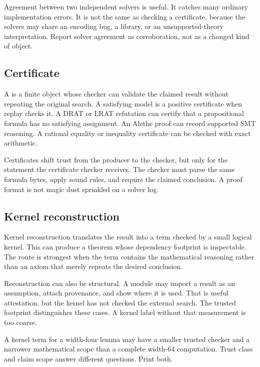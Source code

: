 Agreement between two independent solvers is useful. It catches many ordinary
implementation errors. It is not the same as checking a certificate, because
the solvers may share an encoding bug, a library, or an unsupported-theory
interpretation. Report solver agreement as corroboration, not as a changed
kind of object.

\subsection{Certificate}

A  is a finite object whose checker can validate the
claimed result without repeating the original search. A satisfying model is a
positive certificate when replay checks it. A DRAT or LRAT refutation can
certify that a propositional formula has no satisfying assignment. An Alethe
proof can record supported SMT reasoning. A rational equality or inequality
certificate can be checked with exact arithmetic.

Certificates shift trust from the producer to the checker, but only for the
statement the certificate checker receives. The checker must parse the same
formula bytes, apply sound rules, and require the claimed conclusion. A proof
format is not magic dust sprinkled on a solver log.

\subsection{Kernel reconstruction}

Kernel reconstruction translates the result into a term checked by a small
logical kernel. This can produce a theorem whose dependency footprint is
inspectable. The route is strongest when the term contains the mathematical
reasoning rather than an axiom that merely repeats the desired conclusion.

Reconstruction can also be structural. A module may import a result as an
assumption, attach provenance, and show where it is used. That is useful
attestation, but the kernel has not checked the external search. The trusted
footprint distinguishes these cases. A kernel label without that measurement
is too coarse.

\begin{warning}[title={Higher on the diagram does not mean broader}]
A kernel term for a width-four lemma may have a smaller trusted checker and a
narrower mathematical scope than a complete width-64 computation. Trust class
and claim scope answer different questions. Print both.
\end{warning}

